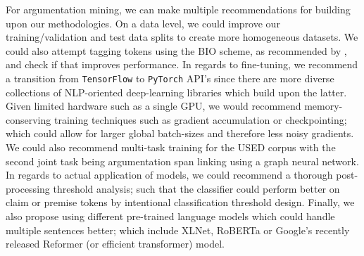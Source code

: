  For argumentation mining, we can make multiple recommendations for building upon our methodologies. On a data level, we could improve our training/validation and test data splits to create more homogeneous datasets. We could also attempt tagging tokens using the BIO scheme, as recommended by \citet{eger2017neural}, and check if that improves performance. In regards to fine-tuning, we recommend a transition from \texttt{TensorFlow} to \texttt{PyTorch} API's since there are more diverse collections of NLP-oriented deep-learning libraries which build upon the latter. Given limited hardware such as a single GPU, we would recommend memory-conserving training techniques such as gradient accumulation or checkpointing; which could allow for larger global batch-sizes and therefore less noisy gradients. We could also recommend multi-task training for the USED corpus with the second joint task being argumentation span linking using a graph neural network. In regards to actual application of models, we could recommend a thorough post-processing threshold analysis; such that the classifier could perform better on claim or premise tokens by intentional classification threshold design. Finally, we also propose using different pre-trained language models which could handle multiple sentences better; which include XLNet, RoBERTa or Google's recently released Reformer (or efficient transformer) model.